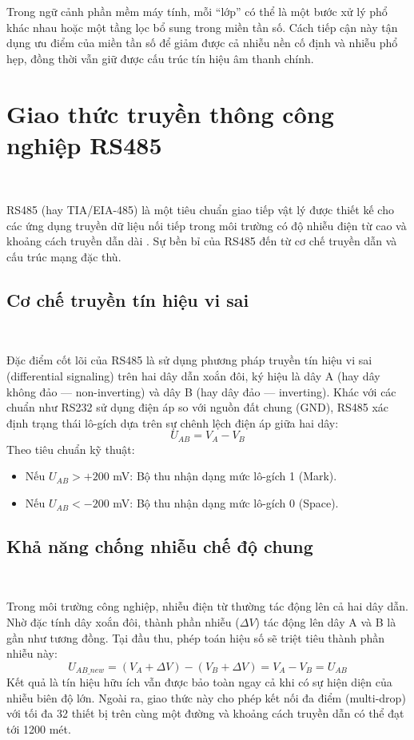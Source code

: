 \documentclass[a4paper]{report}
\begin{document}
Trong ngữ cảnh phần mềm máy tính, mỗi ``lớp'' có thể là một bước xử lý phổ khác nhau hoặc một tầng lọc bổ sung trong miền tần số. Cách tiếp cận này tận dụng ưu điểm của miền tần số để giảm được cả nhiễu nền cố định và nhiễu phổ hẹp, đồng thời vẫn giữ được cấu trúc tín hiệu âm thanh chính.

\section{Giao thức truyền thông công nghiệp RS485}

\ 

RS485 (hay TIA/EIA-485) là một tiêu chuẩn giao tiếp vật lý được thiết kế cho các ứng dụng truyền dữ liệu nối tiếp trong môi trường có độ nhiễu điện từ cao và khoảng cách truyền dẫn dài \cite{tao2026research}. Sự bền bỉ của RS485 đến từ cơ chế truyền dẫn và cấu trúc mạng đặc thù.

\subsection{Cơ chế truyền tín hiệu vi sai}

\ 

Đặc điểm cốt lõi của RS485 là sử dụng phương pháp truyền tín hiệu vi sai (differential signaling) trên hai dây dẫn xoắn đôi, ký hiệu là dây A (hay dây không đảo --- non-inverting) và dây B (hay dây đảo --- inverting). Khác với các chuẩn như RS232 sử dụng điện áp so với nguồn đất chung (GND), RS485 xác định trạng thái lô-gích dựa trên sự chênh lệch điện áp giữa hai dây:
\begin{equation}
   U_{AB} = V_A - V_B
\end{equation}
Theo tiêu chuẩn kỹ thuật:
\begin{itemize}
   \item Nếu $U_{AB} > +200$ mV: Bộ thu nhận dạng mức lô-gích 1 (Mark).
   \item Nếu $U_{AB} < -200$ mV: Bộ thu nhận dạng mức lô-gích 0 (Space).
\end{itemize}

\subsection{Khả năng chống nhiễu chế độ chung}

\ 

Trong môi trường công nghiệp, nhiễu điện từ thường tác động lên cả hai dây dẫn. Nhờ đặc tính dây xoắn đôi, thành phần nhiễu ($\Delta V$) tác động lên dây A và B là gần như tương đồng. Tại đầu thu, phép toán hiệu số sẽ triệt tiêu thành phần nhiễu này:
\begin{equation}
   U_{AB\_new} = (V_A + \Delta V) - (V_B + \Delta V) = V_A - V_B = U_{AB}
\end{equation}
Kết quả là tín hiệu hữu ích vẫn được bảo toàn ngay cả khi có sự hiện diện của nhiễu biên độ lớn. Ngoài ra, giao thức này cho phép kết nối đa điểm (multi-drop) với tối đa 32 thiết bị trên cùng một đường và khoảng cách truyền dẫn có thể đạt tới 1200 mét.
\end{document}
